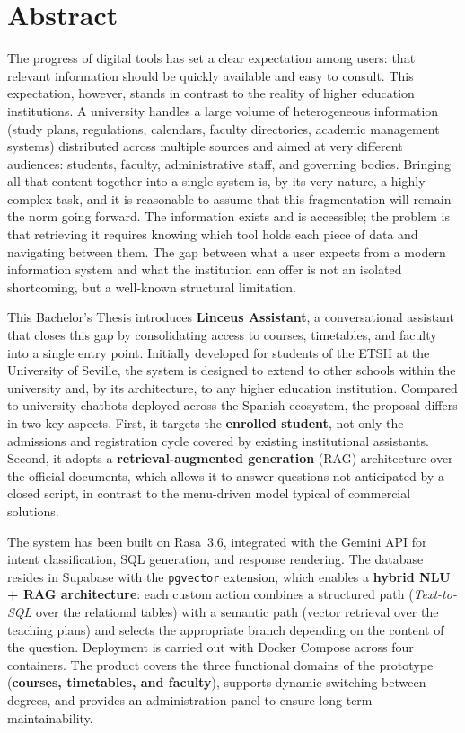 \chapter*{Abstract}\label{cap:abstract}
\titlespacing*{\chapter}{0pt}{30pt}{20pt}

The progress of digital tools has set a clear expectation among users: that relevant information should be quickly available and easy to consult. This expectation, however, stands in contrast to the reality of higher education institutions. A university handles a large volume of heterogeneous information (study plans, regulations, calendars, faculty directories, academic management systems) distributed across multiple sources and aimed at very different audiences: students, faculty, administrative staff, and governing bodies. Bringing all that content together into a single system is, by its very nature, a highly complex task, and it is reasonable to assume that this fragmentation will remain the norm going forward. The information exists and is accessible; the problem is that retrieving it requires knowing which tool holds each piece of data and navigating between them. The gap between what a user expects from a modern information system and what the institution can offer is not an isolated shortcoming, but a well-known structural limitation.

This Bachelor's Thesis introduces \textbf{Linceus Assistant}, a conversational assistant that closes this gap by consolidating access to courses, timetables, and faculty into a single entry point. Initially developed for students of the ETSII at the University of Seville, the system is designed to extend to other schools within the university and, by its architecture, to any higher education institution. Compared to university chatbots deployed across the Spanish ecosystem, the proposal differs in two key aspects. First, it targets the \textbf{enrolled student}, not only the admissions and registration cycle covered by existing institutional assistants. Second, it adopts a \textbf{retrieval-augmented generation} (RAG) architecture over the official documents, which allows it to answer questions not anticipated by a closed script, in contrast to the menu-driven model typical of commercial solutions.

The system has been built on Rasa~3.6, integrated with the Gemini API for intent classification, SQL generation, and response rendering. The database resides in Supabase with the \texttt{pgvector} extension, which enables a \textbf{hybrid NLU + RAG architecture}: each custom action combines a structured path (\textit{Text-to-SQL} over the relational tables) with a semantic path (vector retrieval over the teaching plans) and selects the appropriate branch depending on the content of the question. Deployment is carried out with Docker Compose across four containers. The product covers the three functional domains of the prototype (\textbf{courses, timetables, and faculty}), supports dynamic switching between degrees, and provides an administration panel to ensure long-term maintainability.

